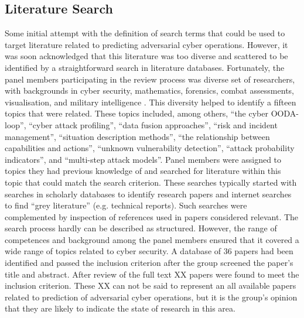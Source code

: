 \documentclass[acmsmall]{acmart}
\begin{document}
\subsection{Literature Search}
Some initial attempt with the definition of search terms that could be used to target literature related to predicting adversarial cyber operations. However, it was soon acknowledged that this literature was too diverse and scattered to be identified by a straightforward search in literature databases. Fortunately, the panel members participating in the review process was diverse set of researchers, with backgrounds in cyber security, mathematics, forensics, combat assessments, visualisation, and military intelligence . This diversity helped to identify a fifteen topics that were related. These topics included, among others, “the cyber OODA-loop”, “cyber attack profiling”, “data fusion approaches”, “risk and incident management”, “situation description methods”, “the relationship between capabilities and actions”, “unknown vulnerability detection”, “attack probability indicators”, and “multi-step attack models”. 
Panel members were assigned to topics they had previous knowledge of and searched for literature within this topic that could match the search criterion. These searches typically started with searches in scholarly databases to identify research papers and internet searches to find “grey literature” (e.g. technical reports). Such searches were complemented by inspection of references used in papers considered relevant. The search process hardly can be described as structured. However, the range of competences and background among the panel members ensured that it covered a wide range of topics related to cyber security. A database of 36 papers had been identified and passed the inclusion criterion after the group screened the paper’s title and abstract. After review of the full text XX papers were found to meet the inclusion criterion. These XX can not be said to represent an all available papers related to prediction of adversarial cyber operations, but it is the group’s opinion that they are likely to indicate the state of research in this area. 
\end{document}
